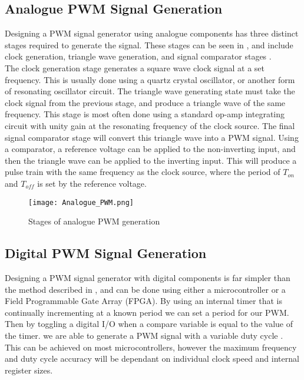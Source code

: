 \subsection{Analogue PWM Signal Generation} \label{S:analogue_PWM_back}

Designing a PWM signal generator using analogue components has three distinct stages required to generate the signal. These stages can be seen in , and include clock generation, triangle wave generation, and signal comparator stages \cite{Caldwell2013}.\\ 

The clock generation stage generates a square wave clock signal at a set frequency. This is usually done using a quartz crystal oscillator, or another form of resonating oscillator circuit. The triangle wave generating state must take the clock signal from the previous stage, and produce a triangle wave of the same frequency. This stage is most often done using a standard op-amp integrating circuit with unity gain at the resonating frequency of the clock source. The final signal comparator stage will convert this triangle wave into a PWM signal. Using a comparator, a reference voltage can be applied to the non-inverting input, and then the triangle wave can be applied to the inverting input. This will produce a pulse train with the same frequency as the clock source, where the period of $T_{on}$ and $T_{off}$ is set by the reference voltage. 

\begin{figure}[H]
	\texttt{[image: Analogue\_PWM.png]}
	\caption{Stages of analogue PWM generation}
	\label{F:analogue_PWM}
\end{figure}


\subsection{Digital PWM Signal Generation}\label{S:digital_PWM_back}

Designing a PWM signal generator with digital components is far simpler than the method described in , and can be done using either a microcontroller or a Field Programmable Gate Array (FPGA). By using an internal timer that is continually incrementing at a known period we can set a period for our PWM. Then by toggling a digital I/O when a compare variable is equal to the value of the timer. we are able to generate a PWM signal with a variable duty cycle \cite{Colley2020}. This can be achieved on most microcontrollers, however the maximum frequency and duty cycle accuracy will be dependant on individual clock speed and internal register sizes.

